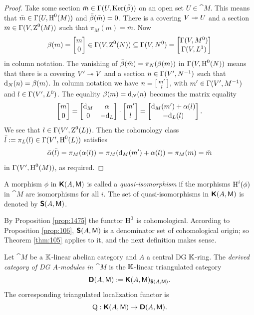 \begin{proof}
Take some section 
$\bar{m} \in \Gamma(U, \operatorname{Ker}(\bar{\beta}))$
on an open set $U \in \cat{M}$.
This means that 
$\bar{m} \in \Gamma(U, \operatorname{H}^0(M))$ and 
$\bar{\beta}(\bar{m}) = 0$. 
There is a covering $V \twoheadrightarrow U$ and a section 
$m \in \Gamma(V, \operatorname{Z}^{0}(M))$ such that 
$\pi_{M}(m) = \bar{m}$. Now 
\[ \beta(m) = \begin{bmatrix} m \\[0.1em] 0 \end{bmatrix} \in \Gamma(V, \operatorname{Z}^{0}(N)) \subseteq 
\Gamma(V, N^{0}) = 
\begin{bmatrix}  \Gamma(V, M^{0}) \\[0.1em] \Gamma(V, L^{1}) \end{bmatrix}  \]
in column notation. 
The vanishing of $\bar{\beta}(\bar{m}) = \pi_N(\beta(m))$ in 
$\Gamma(V, \operatorname{H}^{0}(N))$ means that there is a covering 
$V' \twoheadrightarrow V$ and a section 
$n \in \Gamma(V', N^{-1})$
such that $\mathrm{d}_N(n) = \beta(m)$. 
In column notation we have 
$n = \left[ \begin{smallmatrix} m' \\[0.1em] l \end{smallmatrix} \right]$,
with $m' \in \Gamma(V', M^{-1})$ and $l \in \Gamma(V', L^{0})$. 
The equality $\beta(m) = \mathrm{d}_N(n)$ becomes the matrix equality 
\[ \begin{bmatrix} m \\[0.1em] 0 \end{bmatrix} =
\begin{bmatrix} \mathrm{d}_M & \alpha \\[0.1em] 0 & -\mathrm{d}_{L} \end{bmatrix} \mspace{1.5mu}{\cdot}\mspace{1.5mu} 
\begin{bmatrix} m' \\[0.1em] l \end{bmatrix} = 
\begin{bmatrix}  \mathrm{d}_M(m') + \alpha(l) \\[0.1em] -\mathrm{d}_{L}(l)  \end{bmatrix} . \]
We see that $l \in \Gamma(V', \operatorname{Z}^{0}(L))$. 
Then the cohomology class 
$\bar{l} := \pi_L(l) \in \Gamma(V', \operatorname{H}^{0}(L))$
satisfies 
\[ \bar{\alpha}(\bar{l}) = \pi_M(\alpha(l)) = \pi_M(\mathrm{d}_M(m') + \alpha(l)) = 
\pi_M(m) = \bar{m} \]
in $\Gamma(V', \operatorname{H}^{0}(M))$, as required. 
\end{proof} 

\begin{dfn} \label{dfn:1475}
A morphism $\phi$ in  $\boldsymbol{\mathsf{K}}(A, \operatorname{\mathsf{M}})$ is called a 
{\em quasi-isomorphism}
if the morphisms $\operatorname{H}^i(\phi)$ in $\cat{M}$ are 
isomorphisms for all $i$. 
The set of quasi-isomorphisms in $\boldsymbol{\mathsf{K}}(A, \operatorname{\mathsf{M}})$ is denoted by 
$\boldsymbol{\mathsf{S}}(A, \operatorname{\mathsf{M}})$. 
\end{dfn}

By Proposition \ref{prop:1475} the functor $\operatorname{H}^0$ is cohomological.
According to Proposition \ref{prop:106}, $\boldsymbol{\mathsf{S}}(A, \operatorname{\mathsf{M}})$ is a 
denominator set of cohomological origin; so Theorem \ref{thm:105} applies to 
it, 
and the next definition makes sense. 

\begin{dfn}
Let $\cat{M}$ be a $\mathbb{K}$-linear abelian category and $A$ a central DG $\mathbb{K}$-ring.
The {\em derived category of DG $A$-modules in $\cat{M}$}%
%
%
%
is the $\mathbb{K}$-linear triangulated category 
\[ \boldsymbol{\mathsf{D}}(A, \operatorname{\mathsf{M}}) := \boldsymbol{\mathsf{K}}(A, \operatorname{\mathsf{M}})_{\boldsymbol{\mathsf{S}}(A, \operatorname{\mathsf{M}})} . \]
The corresponding triangulated localization functor is 
\[ \operatorname{Q} : \boldsymbol{\mathsf{K}}(A, \operatorname{\mathsf{M}}) \to \boldsymbol{\mathsf{D}}(A, \operatorname{\mathsf{M}}) . \]
\end{dfn}

